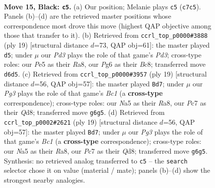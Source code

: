 \documentclass[11pt]{article}
\begin{document}
\begin{figure}[p]\centering
\begin{subfigure}{0.46\textwidth}\centering
\resizebox{\linewidth}{!}{%
\newchessgame
\chessboard[
  setfen={2bq1rk1/r1p1bp1p/p2p1np1/n3p3/Pp2P3/3P1Q1N/BPPB1PPP/RN2R1K1 b - - 5 15},
  showmover=false,
  pgfstyle=straightmove, color=movearrow, markmove={c7-c5}
]}
\caption{}
\end{subfigure}\hfill
\begin{subfigure}{0.46\textwidth}\centering
\resizebox{\linewidth}{!}{%
\newchessgame
\chessboard[
  setfen={r1bq1rk1/1pp2pb1/p1np1npp/P3p3/2B1P3/2PP1N1P/1P3PP1/RNBQR1K1 b - - 0 10},
  showmover=false,
  pgfstyle=straightmove, color=movearrow, markmove={d6-d5}
]}
\caption{}
\end{subfigure}
\\[4pt]
\begin{subfigure}{0.46\textwidth}\centering
\resizebox{\linewidth}{!}{%
\newchessgame
\chessboard[
  setfen={r1bq1rk1/2p1bppp/p2p1n2/np2p3/P3P3/3P1N2/BPP2PPP/RNBQR1K1 b - - 2 10},
  showmover=false,
  pgfstyle=straightmove, color=movearrow, markmove={c8-d7}
]}
\caption{}
\end{subfigure}\hfill
\begin{subfigure}{0.46\textwidth}\centering
\resizebox{\linewidth}{!}{%
\newchessgame
\chessboard[
  setfen={r1bq1rk1/2p1bppp/p2p1n2/np2p3/P3P3/3P1N2/BPP2PPP/RNBQR1K1 b - - 2 10},
  showmover=false,
  pgfstyle=straightmove, color=movearrow, markmove={c8-d7}
]}
\caption{}
\end{subfigure}
\caption{\textbf{Move 15, Black: \texttt{c5}.} (a) Our position; Melanie plays \texttt{c5} (\texttt{c7c5}). Panels (b)--(d) are the retrieved master positions whose correspondence most drove this move (highest QAP objective among those that transfer to it). (b) Retrieved from \texttt{ccrl\_top\_p0000\#3888} (ply 19) [structural distance $d$=73, QAP obj=61]: the master played \texttt{d5}; under $\mu$ our \emph{Pd3} plays the role of that game's \emph{Pd3}; cross-type roles: our \emph{P}e5 as their \emph{R}a8, our \emph{P}g6 as their \emph{B}c8; transferred move \texttt{d6d5}. (c) Retrieved from \texttt{ccrl\_top\_p0000\#3957} (ply 19) [structural distance $d$=56, QAP obj=57]: the master played \texttt{Bd7}; under $\mu$ our \emph{Pg3} plays the role of that game's \emph{Bc1} (a \textbf{cross-type} correspondence); cross-type roles: our \emph{N}a5 as their \emph{R}a8, our \emph{P}c7 as their \emph{Q}d8; transferred move \texttt{g6g5}. (d) Retrieved from \texttt{ccrl\_top\_p0002\#2621} (ply 19) [structural distance $d$=56, QAP obj=57]: the master played \texttt{Bd7}; under $\mu$ our \emph{Pg3} plays the role of that game's \emph{Bc1} (a \textbf{cross-type} correspondence); cross-type roles: our \emph{N}a5 as their \emph{R}a8, our \emph{P}c7 as their \emph{Q}d8; transferred move \texttt{g6g5}. Synthesis: no retrieved analog transferred to \texttt{c5} -- the \texttt{search} selector chose it on value (material / mate); panels (b)--(d) show the strongest nearby analogies.}
\label{fig:thought-m29}
\end{figure}
\end{document}
